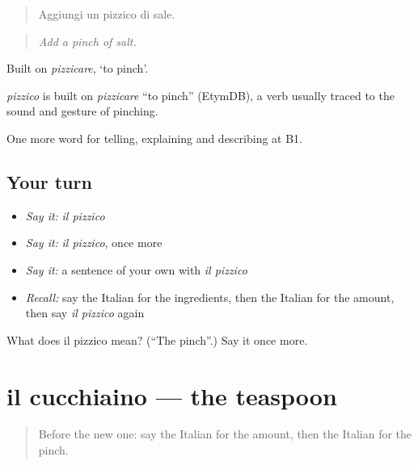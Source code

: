 \begin{quote}
Aggiungi un pizzico di sale.
\end{quote}

\begin{quote}
\emph{Add a pinch of salt.}
\end{quote}

Built on \emph{pizzicare}, ‘to pinch’.

\begin{cousinweb}
\emph{pizzico} is built on \emph{pizzicare} \textquotedblleft{}to pinch\textquotedblright{} (EtymDB), a verb usually traced to the sound and gesture of pinching.
\end{cousinweb}

\begin{grammarlens}[title={What you've built}]
One more word for telling, explaining and describing at B1.
\end{grammarlens}

\subsection*{Your turn}
\begin{itemize}
\raggedright
  \item \emph{Say it:} \emph{il pizzico}
  \item \emph{Say it:} \emph{il pizzico}, once more
  \item \emph{Say it:} a sentence of your own with \emph{il pizzico}
  \item \emph{Recall:} say the Italian for the ingredients, then the Italian for the amount, then say \emph{il pizzico} again
\end{itemize}

\begin{tcolorbox}[breakable,colback=teal!4,colframe=teal!35!black,title={Before you move on}]
What does il pizzico mean? (\textquotedblleft{}The pinch\textquotedblright{}.) Say it once more.
\end{tcolorbox}
\section[il cucchiaino]{il cucchiaino — the teaspoon}

\label{lesson:IT-C331-cucchiaino}



\begin{quote}
Before the new one: say the Italian for the amount, then the Italian for the pinch.
\end{quote}

